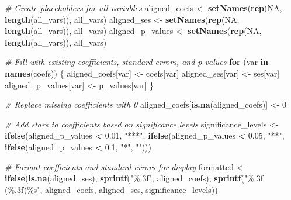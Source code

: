 \documentclass[
]{article}
\newenvironment{Shaded}{\begin{snugshade}}{\end{snugshade}}
\newcommand{\CommentTok}[1]{\textcolor[rgb]{0.56,0.35,0.01}{\textit{#1}}}
\newcommand{\ConstantTok}[1]{\textcolor[rgb]{0.56,0.35,0.01}{#1}}
\newcommand{\ControlFlowTok}[1]{\textcolor[rgb]{0.13,0.29,0.53}{\textbf{#1}}}
\newcommand{\DecValTok}[1]{\textcolor[rgb]{0.00,0.00,0.81}{#1}}
\newcommand{\FloatTok}[1]{\textcolor[rgb]{0.00,0.00,0.81}{#1}}
\newcommand{\FunctionTok}[1]{\textcolor[rgb]{0.13,0.29,0.53}{\textbf{#1}}}
\newcommand{\NormalTok}[1]{#1}
\newcommand{\OtherTok}[1]{\textcolor[rgb]{0.56,0.35,0.01}{#1}}
\newcommand{\SpecialCharTok}[1]{\textcolor[rgb]{0.81,0.36,0.00}{\textbf{#1}}}
\newcommand{\StringTok}[1]{\textcolor[rgb]{0.31,0.60,0.02}{#1}}
\begin{document}
\begin{Shaded}
\begin{Highlighting}[]
  \CommentTok{\# Create placeholders for all variables}
\NormalTok{  aligned\_coefs }\OtherTok{\textless{}{-}} \FunctionTok{setNames}\NormalTok{(}\FunctionTok{rep}\NormalTok{(}\ConstantTok{NA}\NormalTok{, }\FunctionTok{length}\NormalTok{(all\_vars)), all\_vars)}
\NormalTok{  aligned\_ses }\OtherTok{\textless{}{-}} \FunctionTok{setNames}\NormalTok{(}\FunctionTok{rep}\NormalTok{(}\ConstantTok{NA}\NormalTok{, }\FunctionTok{length}\NormalTok{(all\_vars)), all\_vars)}
\NormalTok{  aligned\_p\_values }\OtherTok{\textless{}{-}} \FunctionTok{setNames}\NormalTok{(}\FunctionTok{rep}\NormalTok{(}\ConstantTok{NA}\NormalTok{, }\FunctionTok{length}\NormalTok{(all\_vars)), all\_vars)}

  \CommentTok{\# Fill with existing coefficients, standard errors, and p{-}values}
  \ControlFlowTok{for}\NormalTok{ (var }\ControlFlowTok{in} \FunctionTok{names}\NormalTok{(coefs)) \{}
\NormalTok{    aligned\_coefs[var] }\OtherTok{\textless{}{-}}\NormalTok{ coefs[var]}
\NormalTok{    aligned\_ses[var] }\OtherTok{\textless{}{-}}\NormalTok{ ses[var]}
\NormalTok{    aligned\_p\_values[var] }\OtherTok{\textless{}{-}}\NormalTok{ p\_values[var]}
\NormalTok{  \}}

  \CommentTok{\# Replace missing coefficients with 0}
\NormalTok{  aligned\_coefs[}\FunctionTok{is.na}\NormalTok{(aligned\_coefs)] }\OtherTok{\textless{}{-}} \DecValTok{0}

  \CommentTok{\# Add stars to coefficients based on significance levels}
\NormalTok{  significance\_levels }\OtherTok{\textless{}{-}} \FunctionTok{ifelse}\NormalTok{(aligned\_p\_values }\SpecialCharTok{\textless{}} \FloatTok{0.01}\NormalTok{, }\StringTok{"***"}\NormalTok{,}
                          \FunctionTok{ifelse}\NormalTok{(aligned\_p\_values }\SpecialCharTok{\textless{}} \FloatTok{0.05}\NormalTok{, }\StringTok{"**"}\NormalTok{,}
                          \FunctionTok{ifelse}\NormalTok{(aligned\_p\_values }\SpecialCharTok{\textless{}} \FloatTok{0.1}\NormalTok{, }\StringTok{"*"}\NormalTok{, }\StringTok{""}\NormalTok{)))}

  \CommentTok{\# Format coefficients and standard errors for display}
\NormalTok{  formatted }\OtherTok{\textless{}{-}} \FunctionTok{ifelse}\NormalTok{(}\FunctionTok{is.na}\NormalTok{(aligned\_ses),}
                      \FunctionTok{sprintf}\NormalTok{(}\StringTok{"\%.3f"}\NormalTok{, aligned\_coefs),}
                      \FunctionTok{sprintf}\NormalTok{(}\StringTok{"\%.3f (\%.3f)\%s"}\NormalTok{, aligned\_coefs, aligned\_ses, significance\_levels))}


\end{Highlighting}
\end{Shaded}
\end{document}
